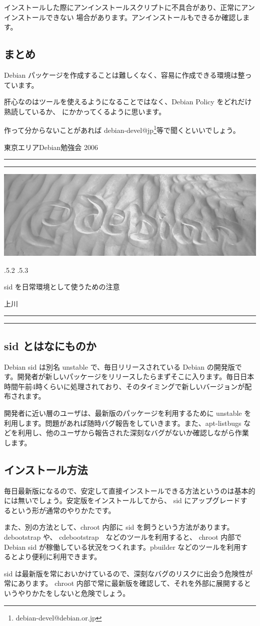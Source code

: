 \documentclass[mingoth,a4paper]{jsarticle}
\makeatletter
\renewcommand{\section}{\@startsection{section}{1}{\z@}%
    {\Cvs \@plus.5\Cdp \@minus.2\Cdp}%
    {.5\Cvs \@plus.3\Cdp}%
    {\normalfont\Huge\headfont\raggedright\centering}} %
\newcommand{\dancersection}[2]{%
\newpage
東京エリアDebian勉強会 2006
\hrule
\vspace{0.5mm}
\hrule
\hfill{}\includegraphics[width=16cm]{image2006-natsu/guruguru-sand-light.png}\\
\vspace{-5cm}
\begin{center}
\section{#1}
\end{center}
\hfill{}\colorbox{white}{#2}\hspace{3cm}\space\\
\vspace{1cm}
\hrule
\vspace{0.5mm}
\hrule
\vspace{1cm}
}
\makeatother
\begin{document}
		インストールした際にアンインストールスクリプトに不具合があり、正常にアンインストールできない
		場合があります。アンインストールもできるか確認します。

\subsection{まとめ}
	Debian パッケージを作成することは難しくなく、容易に作成できる環境は整っています。
	
	肝心なのはツールを使えるようになることではなく、Debian Policy をどれだけ熟読しているか、
	にかかってくるように思います。
	
	作って分からないことがあれば debian-devel@jp\footnote{debian-devel@debian.or.jp}等で聞くといいでしょう。	
	

\dancersection{sid を日常環境として使うための注意}{上川}
\label{sec:YYY}

\subsection{sid とはなにものか}

Debian sid は別名 unstable で、毎日リリースされている Debian の開発版で
す。開発者が新しいパッケージをリリースしたらまずそこに入ります。毎日日本
時間午前4時くらいに処理されており、そのタイミングで新しいバージョンが配
布されます。

開発者に近い層のユーザは、最新版のパッケージを利用するために unstable を
利用します。問題があれば随時バグ報告をしていきます。また、apt-listbugs
などを利用し、他のユーザから報告された深刻なバグがないか確認しながら作業
します。


\subsection{インストール方法}

毎日最新版になるので、安定して直接インストールできる方法というのは基本的
には無いでしょう。安定版をインストールしてから、 sid にアップグレードす
るという形が通常のやりかたです。

また、別の方法として、chroot 内部に sid を飼うという方法があります。
debootstrap や、 cdebootstrap　などのツールを利用すると、 chroot 内部で
Debian sid が稼働している状況をつくれます。pbuilder などのツールを利用す
るとより便利に利用できます。

sid は最新版を常においかけているので、深刻なバグのリスクに出会う危険性が
常にあります。 chroot 内部で常に最新版を確認して、それを外部に展開すると
いうやりかたをしないと危険でしょう。
\end{document}
